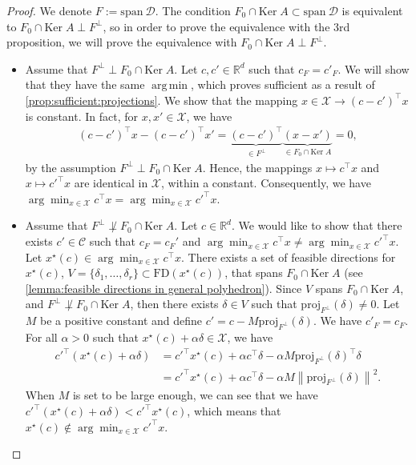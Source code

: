 \documentclass[11pt]{article}
\theoremstyle{plain}
\theoremstyle{definition}
\newcommand{\R}[0]{\mathbb R}
\newcommand{\Ker}[0]{\mathrm{Ker}\;}
\newcommand{\Vect}{\mathrm{span}~}
\newcommand{\proj}[2]{\mathrm{proj}_{#1}\left(#2\right)}
\newcommand{\norm}[1]{\left\lVert#1\right\rVert}
\newcommand{\suff}{sufficient}
\newcommand{\FD}{\mathrm{FD}}
\newcommand{\cX}{\mathcal{X}}
\newcommand{\cC}{\mathcal{C}}
\newcommand{\cD}{\mathcal{D}}
\DeclareMathOperator*{\argmin}{arg\,min}
\begin{document}
        \begin{proof}
        We denote $F:=\Vect \cD$. The condition $F_0\cap \Ker A \subset  \Vect \cD$ is equivalent to $F_0\cap \Ker A\perp F^\perp$, so in order to prove the equivalence with the 3rd proposition, we will prove the equivalence with $F_0\cap \Ker A\perp  F^\perp$.
    \begin{itemize}
        \item Assume that $ F^\perp\perp F_0 \cap \Ker A$.
        Let $c,c'\in \R^d$ such that $c_F=c'_F$. We will show that they have the same $\argmin$, which proves \suff{} as a result of \cref{prop:sufficient:projections}. We show that the mapping $x \in \cX \to (c-c')^\top x$ is constant. In fact, for $x,x' \in \cX$, we have
        \begin{align*} 
            (c-c')^\top x - (c-c')^\top x' = \underbrace{(c-c')^\top}_{\in  F^\perp} \underbrace{(x-x')}_{\in F_0 \cap \Ker A}=0,
        \end{align*}
        by the assumption $F^\perp\perp F_0 \cap \Ker A$.
Hence, the mappings $x\longmapsto c^\top x$ and $x\longmapsto c'^\top x$ are identical in $\cX$, within a constant. Consequently, we have $\arg \min_{x\in \cX}c^\top x = \arg\min_{x\in \cX}c'^\top x$.
        
        \item Assume that $ F^\perp\not\perp F_0 \cap \Ker A $.
        Let $c\in \R^d$.
        We would like to show that there exists $c'\in \cC$ such that $c_F=c_F'$ and $\arg\min_{x\in \cX}c^\top x \neq \arg\min_{x\in \cX}c'^\top x$. 
      Let $x^\star(c)\in \arg\min_{x\in \cX}c^\top x$. There exists a set of feasible directions for $x^\star(c)$, $V=\{\delta_1,\dots,\delta_r\} \subset \FD(x^\star(c))$, that spans $F_0 \cap \Ker A$ (see \cref{lemma:feasible directions in general polyhedron}). Since $V$ spans $F_0\cap \Ker A$, and $ F^\perp\not\perp F_0 \cap \Ker A $, then there exists $\delta\in V$ such that $\proj{ F^\perp}{\delta}\neq 0$. Let $M$ be a positive constant and define $c' = c -M \proj{ F^\perp}{\delta}$. We have $c'_F = c_F$. For all $\alpha >0$ such that $x^\star(c)+\alpha \delta \in \cX$, we have
    \begin{align*}
                c'^\top (x^\star(c)+\alpha \delta) &= {c'}^\top x^\star(c) + \alpha c^\top \delta - \alpha M\proj{F^\perp}{\delta}^\top \delta\\
                &=c'^\top x^\star(c) + \alpha c^\top \delta - \alpha M \norm{\proj{ F^\perp}{\delta}}^2.
            \end{align*}
            When $M$ is set to be large enough, we can see that we have $c'^\top (x^\star(c)+\alpha \delta )<c'^\top x^\star(c)$, which means that $x^\star (c)\not\in \arg\min_{x\in \cX}c'^\top x$.
  

\end{itemize}
\end{proof}
\end{document}
